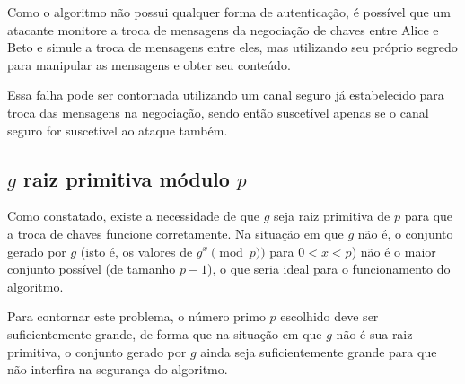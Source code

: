 \documentclass[12pt]{article}
\begin{document}
Como o algoritmo não possui qualquer forma de autenticação, é possível que um
atacante monitore a troca de mensagens da negociação de chaves entre Alice e
Beto e simule a troca de mensagens entre eles, mas utilizando seu próprio
segredo para manipular as mensagens e obter seu conteúdo.

Essa falha pode ser contornada utilizando um canal seguro já estabelecido para
troca das mensagens na negociação, sendo então suscetível apenas se o canal
seguro for suscetível ao ataque também.

\subsection{$g$ raiz primitiva módulo $p$}

Como constatado, existe a necessidade de que $g$ seja raiz primitiva de $p$
para que a troca de chaves funcione corretamente. Na situação em que $g$ não é,
o conjunto gerado por $g$ (isto é, os valores de $g^{x} \pmod{p})$ para
$0 < x < p$) não é o maior conjunto possível (de tamanho $p - 1$), o que seria
ideal para o funcionamento do algoritmo.

Para contornar este problema, o número primo $p$ escolhido deve ser
suficientemente grande, de forma que na situação em que $g$ não é sua raiz
primitiva, o conjunto gerado por $g$ ainda seja suficientemente grande para que
não interfira na segurança do algoritmo.
\end{document}
